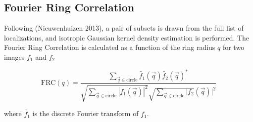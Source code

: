 \documentclass{ucetd}
\begin{document}


\subsection{Fourier Ring Correlation}

Following (Nieuwenhuizen 2013), a pair of subsets is drawn from the full list of localizations, and isotropic Gaussian kernel density estimation is performed. The Fourier Ring Correlation is calculated as a function of the ring radius $q$ for two images $f_{1}$ and $f_{2}$

\begin{equation*}
\mathrm{FRC}(q) = \frac{\sum_{\vec{q}\in\mathrm{circle}}\tilde{f_{1}}(\vec{q})\tilde{f_{2}}(\vec{q})^{*}}{\sqrt{\sum_{\vec{q}\in\mathrm{circle}}|f_{1}(\vec{q})|^{2}}\sqrt{\sum_{\vec{q}\in\mathrm{circle}}|f_{2}}(\vec{q})|^{2}}
\end{equation*}

where $\tilde{f_{1}}$ is the discrete Fourier transform of $f_{1}$.
\end{document}

